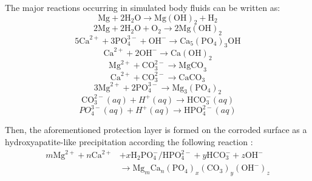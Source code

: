 The major reactions occurring in simulated body fluids can be written as:
\begin{equation}
\mathrm{Mg}+2 \mathrm{H}_{2} \mathrm{O} \rightarrow \mathrm{Mg}(\mathrm{OH})_{2}+\mathrm{H}_{2}
\end{equation}
\begin{equation}
2 \mathrm{Mg}+2 \mathrm{H}_{2} \mathrm{O}+\mathrm{O}_{2} \rightarrow 2 \mathrm{Mg}(\mathrm{OH})_{2}
\end{equation}
\begin{equation}
5 \mathrm{Ca}^{2+}+3 \mathrm{PO}_{4}^{3-}+\mathrm{OH}^{-} \rightarrow \mathrm{Ca}_{5}\left(\mathrm{PO}_{4}\right)_{3} \mathrm{OH}
\end{equation}
\begin{equation}
\mathrm{Ca}^{2+}+2 \mathrm{OH}^{-} \rightarrow \mathrm{Ca}(\mathrm{OH})_{2}
\end{equation}
\begin{equation}
\mathrm{Mg}^{2+}+\mathrm{CO}_{3}^{2-} \rightarrow \mathrm{MgCO}_{3}
\end{equation}
\begin{equation}
\mathrm{Ca}^{2+}+\mathrm{CO}_{3}^{2-} \rightarrow \mathrm{CaCO}_{3}
\end{equation}
\begin{equation}
 3 \mathrm{Mg}^{2+}+2 \mathrm{PO}_{4}^{3-} \rightarrow \mathrm{Mg}_{3}\left(\mathrm{PO}_{4}\right)_{2}
\end{equation}
\begin{equation}
\mathrm{CO}_{3}^{2-}(a q)+H^{+}(a q) \rightarrow \mathrm{HCO}_{3}^{-}(a q)
\end{equation}
\begin{equation}
P O_{4}^{3-}(a q)+H^{+}(a q)\rightarrow \mathrm{HPO}_{4}^{2-}(a q)
\end{equation}

Then, the aforementioned protection layer is formed on the corroded surface as a hydroxyapatite-like precipitation according the following reaction \cite{Atrens2015,Song2009,Silva2018,Jiang2019}:
\begin{equation} \label{eq:kinetics_hydrox_react}
\begin{aligned}
m \mathrm{Mg}^{2+}+n \mathrm{Ca}^{2+}&+x \mathrm{H}_{2} \mathrm{PO}_{4}^{-} / \mathrm{HPO}_{4}^{2-}+y \mathrm{HCO}_{3}^{-}+z \mathrm{OH}^{-}\\
& \rightarrow \mathrm{Mg}_{m} \mathrm{Ca}_{n}\left(\mathrm{PO}_{4}\right)_{x}\left(\mathrm{CO}_{3}\right)_{y}\left(\mathrm{OH}^{-}\right)_{z}
\end{aligned}
\end{equation}

